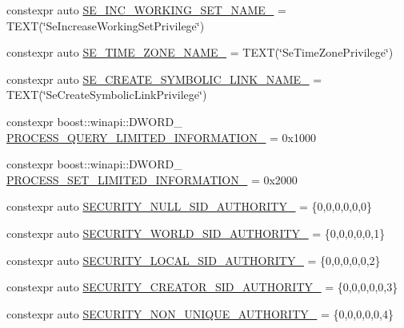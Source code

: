 \begin{DoxyCompactItemize}
\item 
constexpr auto \mbox{\hyperlink{namespaceboost_1_1winapi_aaae41a9202a5fdf5c89c50446f24afdb}{S\+E\+\_\+\+I\+N\+C\+\_\+\+W\+O\+R\+K\+I\+N\+G\+\_\+\+S\+E\+T\+\_\+\+N\+A\+M\+E\+\_\+}} = T\+E\+XT(\char`\"{}Se\+Increase\+Working\+Set\+Privilege\char`\"{})
\item 
constexpr auto \mbox{\hyperlink{namespaceboost_1_1winapi_ae247e2a627f5dcd340f927f6cfa50555}{S\+E\+\_\+\+T\+I\+M\+E\+\_\+\+Z\+O\+N\+E\+\_\+\+N\+A\+M\+E\+\_\+}} = T\+E\+XT(\char`\"{}Se\+Time\+Zone\+Privilege\char`\"{})
\item 
constexpr auto \mbox{\hyperlink{namespaceboost_1_1winapi_a2ae31c1d8077b060bfd5ec88aeae2fc4}{S\+E\+\_\+\+C\+R\+E\+A\+T\+E\+\_\+\+S\+Y\+M\+B\+O\+L\+I\+C\+\_\+\+L\+I\+N\+K\+\_\+\+N\+A\+M\+E\+\_\+}} = T\+E\+XT(\char`\"{}Se\+Create\+Symbolic\+Link\+Privilege\char`\"{})
\item 
constexpr boost\+::winapi\+::\+D\+W\+O\+R\+D\+\_\+ \mbox{\hyperlink{namespaceboost_1_1winapi_aa45667ccb1da2a98f99baa20dc1e1b7a}{P\+R\+O\+C\+E\+S\+S\+\_\+\+Q\+U\+E\+R\+Y\+\_\+\+L\+I\+M\+I\+T\+E\+D\+\_\+\+I\+N\+F\+O\+R\+M\+A\+T\+I\+O\+N\+\_\+}} = 0x1000
\item 
constexpr boost\+::winapi\+::\+D\+W\+O\+R\+D\+\_\+ \mbox{\hyperlink{namespaceboost_1_1winapi_a15e0e085fc86590ce8d5a34191c5b98e}{P\+R\+O\+C\+E\+S\+S\+\_\+\+S\+E\+T\+\_\+\+L\+I\+M\+I\+T\+E\+D\+\_\+\+I\+N\+F\+O\+R\+M\+A\+T\+I\+O\+N\+\_\+}} = 0x2000
\item 
constexpr auto \mbox{\hyperlink{namespaceboost_1_1winapi_a745368d76bff0c2e861baae91410be59}{S\+E\+C\+U\+R\+I\+T\+Y\+\_\+\+N\+U\+L\+L\+\_\+\+S\+I\+D\+\_\+\+A\+U\+T\+H\+O\+R\+I\+T\+Y\+\_\+}} = \{0,0,0,0,0,0\}
\item 
constexpr auto \mbox{\hyperlink{namespaceboost_1_1winapi_a9abad95ee67afaea5d6b90e68d6160a9}{S\+E\+C\+U\+R\+I\+T\+Y\+\_\+\+W\+O\+R\+L\+D\+\_\+\+S\+I\+D\+\_\+\+A\+U\+T\+H\+O\+R\+I\+T\+Y\+\_\+}} = \{0,0,0,0,0,1\}
\item 
constexpr auto \mbox{\hyperlink{namespaceboost_1_1winapi_a571c6e659dddc219164e99df989b1273}{S\+E\+C\+U\+R\+I\+T\+Y\+\_\+\+L\+O\+C\+A\+L\+\_\+\+S\+I\+D\+\_\+\+A\+U\+T\+H\+O\+R\+I\+T\+Y\+\_\+}} = \{0,0,0,0,0,2\}
\item 
constexpr auto \mbox{\hyperlink{namespaceboost_1_1winapi_af3beea09d687e7440a8cc9bcb5eebab3}{S\+E\+C\+U\+R\+I\+T\+Y\+\_\+\+C\+R\+E\+A\+T\+O\+R\+\_\+\+S\+I\+D\+\_\+\+A\+U\+T\+H\+O\+R\+I\+T\+Y\+\_\+}} = \{0,0,0,0,0,3\}
\item 
constexpr auto \mbox{\hyperlink{namespaceboost_1_1winapi_ac1b4d470505754f9a4bb06ef2eb9c51c}{S\+E\+C\+U\+R\+I\+T\+Y\+\_\+\+N\+O\+N\+\_\+\+U\+N\+I\+Q\+U\+E\+\_\+\+A\+U\+T\+H\+O\+R\+I\+T\+Y\+\_\+}} = \{0,0,0,0,0,4\}

\end{DoxyCompactItemize}

